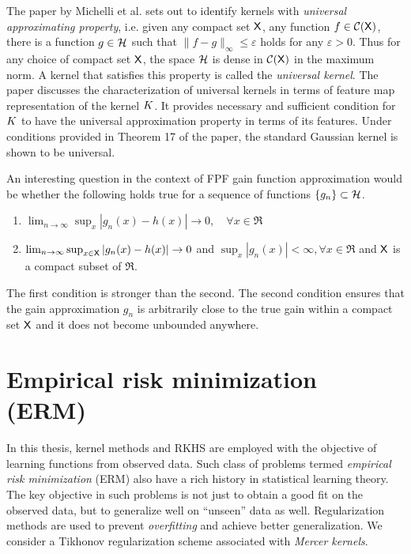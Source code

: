 The paper by Michelli et al. \cite{micchaxuzha06} sets out to identify kernels with \textit{universal approximating property}, i.e. given any compact set ${\sf X}$, any function $f \in \mathcal{C}({\sf X})$, there is a function $g \in {\cal H}$ such that $\| f - g\|_{\infty} \leq \varepsilon$ holds for any $\varepsilon > 0$. Thus for any choice of compact set ${\sf X}$, the space ${\cal H}$ is dense in $\mathcal{C}({\sf X})$ in the maximum norm. A kernel that satisfies this property is called the \textit{universal kernel}. The paper discusses the characterization of universal kernels in terms of feature map representation of the kernel $K$. It provides necessary and sufficient condition for $K$ to have the universal approximation property in terms of its features. Under conditions provided in Theorem 17 of the paper, the standard Gaussian kernel is shown to be universal. 


An interesting question in the context of FPF gain function approximation would be whether the following holds true for a sequence of functions $\{g_n\} \subset {\cal H}$.
\begin{enumerate}
\item $\lim_{n \to \infty} \sup_x |g_n(x) -h(x) | \to 0,\quad \forall x \in \Re$
\item $ \lim_{n \to \infty}\sup_{x \in {\sf X}} |g_n(x) - h(x) | \to 0$ and $\sup_x |g_n(x)| < \infty,  \forall x \in \Re$ and ${\sf X}$ is a compact subset of $\Re$. 
\end{enumerate}
The first condition is stronger than the second. The second condition ensures that the gain approximation $g_n$ is arbitrarily close to the true gain within a compact set ${\sf X}$ and it does not become unbounded anywhere. 


\section{Empirical risk minimization (ERM)}
\label{s:erm}
In this thesis, kernel methods and RKHS are employed with the objective of learning functions from observed data. Such class of problems termed \textit{empirical risk minimization} (ERM) also have a rich history in statistical learning theory. The key objective in such problems is not just to obtain a good fit on the observed data, but to generalize well on ``unseen'' data as well. Regularization methods are used to prevent \textit{overfitting} and achieve better generalization. We consider a Tikhonov regularization scheme \cite{tikars79} associated with \textit{Mercer kernels}.

